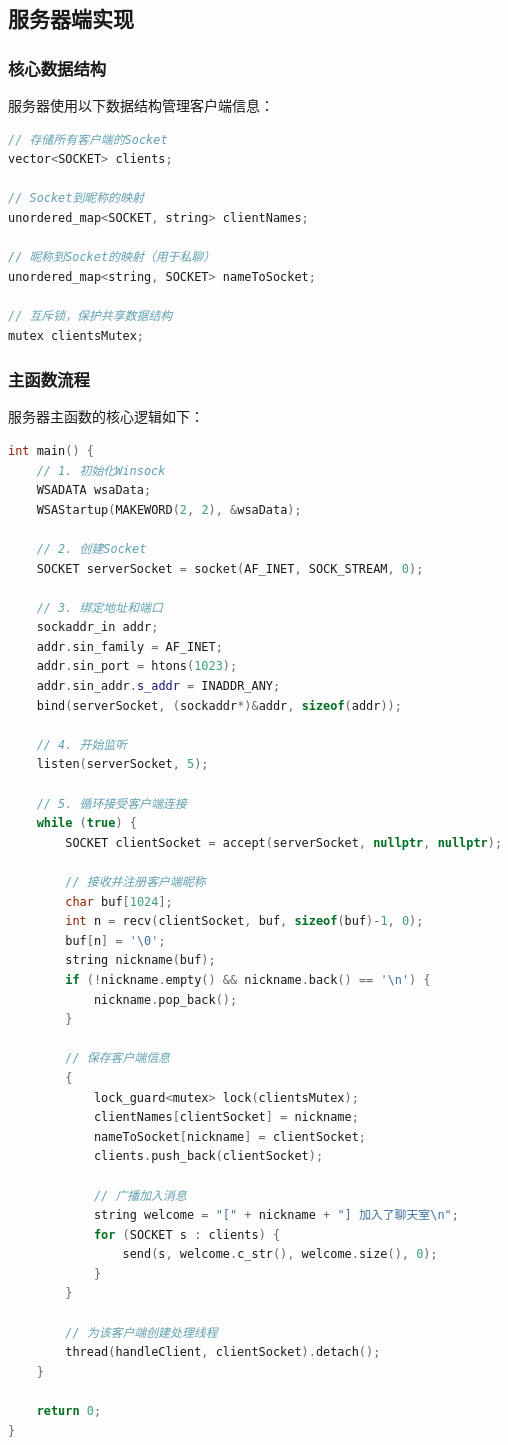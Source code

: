 \documentclass[12pt, a4paper]{article}
\begin{document}
\subsection{服务器端实现}

\subsubsection{核心数据结构}

服务器使用以下数据结构管理客户端信息：

\begin{lstlisting}[language=c++]
// 存储所有客户端的Socket
vector<SOCKET> clients;

// Socket到昵称的映射
unordered_map<SOCKET, string> clientNames;

// 昵称到Socket的映射（用于私聊）
unordered_map<string, SOCKET> nameToSocket;

// 互斥锁，保护共享数据结构
mutex clientsMutex;
\end{lstlisting}

\subsubsection{主函数流程}

服务器主函数的核心逻辑如下：

\begin{lstlisting}[language=c++]
int main() {
    // 1. 初始化Winsock
    WSADATA wsaData;
    WSAStartup(MAKEWORD(2, 2), &wsaData);
    
    // 2. 创建Socket
    SOCKET serverSocket = socket(AF_INET, SOCK_STREAM, 0);
    
    // 3. 绑定地址和端口
    sockaddr_in addr;
    addr.sin_family = AF_INET;
    addr.sin_port = htons(1023);
    addr.sin_addr.s_addr = INADDR_ANY;
    bind(serverSocket, (sockaddr*)&addr, sizeof(addr));
    
    // 4. 开始监听
    listen(serverSocket, 5);
    
    // 5. 循环接受客户端连接
    while (true) {
        SOCKET clientSocket = accept(serverSocket, nullptr, nullptr);
        
        // 接收并注册客户端昵称
        char buf[1024];
        int n = recv(clientSocket, buf, sizeof(buf)-1, 0);
        buf[n] = '\0';
        string nickname(buf);
        if (!nickname.empty() && nickname.back() == '\n') {
            nickname.pop_back();
        }
        
        // 保存客户端信息
        {
            lock_guard<mutex> lock(clientsMutex);
            clientNames[clientSocket] = nickname;
            nameToSocket[nickname] = clientSocket;
            clients.push_back(clientSocket);
            
            // 广播加入消息
            string welcome = "[" + nickname + "] 加入了聊天室\n";
            for (SOCKET s : clients) {
                send(s, welcome.c_str(), welcome.size(), 0);
            }
        }
        
        // 为该客户端创建处理线程
        thread(handleClient, clientSocket).detach();
    }
    
    return 0;
}
\end{lstlisting}
\end{document}
